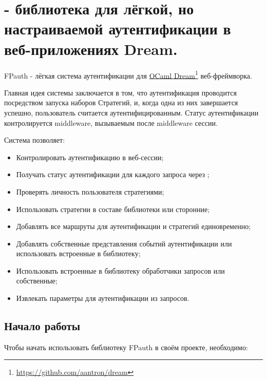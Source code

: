 \section{ - библиотека для лёгкой, но настраиваемой аутентификации в веб-приложениях Dream.\label{fpauth---библиотека-для-лёгкой,-но-в-то-же-время-настраиваемой-аутентификации-в-веб-приложениях-dream.}}\label{page-FPauth-leaf-page-index}%
FPauth - лёгкая система аутентификации для \href{https://github.com/aantron/dream}{OCaml Dream}\footnote{\url{https://github.com/aantron/dream}} веб-фреймворка.

Главная идея системы заключается в том, что аутентификация проводится посредством запуска наборов Стратегий, и, когда одна из них завершается успешно, пользователь считается аутентифицированным. Статус аутентификации контролируется middleware, вызываемым после middleware сессии.

Система позволяет:

\begin{itemize}\item{Контролировать аутентификацию в веб-сессии;}%
\item{Получать статус аутентификации для каждого запроса через ;}%
\item{Проверять личность пользователя стратегиями;}%
\item{Использовать стратегии в составе библиотеки или сторонние;}%
\item{Добавлять все маршруты для аутентификации и стратегий единовременно;}%
\item{Добавлять собственные представления событий аутентификации или использовать встроенные в библиотеку;}%
\item{Использовать встроенные в библиотеку обработчики запросов или собственные;}%
\item{Извлекать параметры для аутентификации из запросов.}\end{itemize}%
\subsection{Начало работы\label{Начало-работы}}%
Чтобы начать использовать библиотеку FPauth в своём проекте, необходимо:

